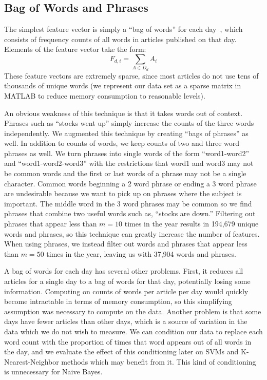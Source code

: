 \documentclass[10pt, twocolumn]{article}
\begin{document}
\subsection{Bag of Words and Phrases}
\label{sec:bagsofwords}

The simplest feature vector is simply a ``bag of words'' for each day~\cite{featurehash}, which consists of frequency counts of all words in articles published on that day. Elements of the feature vector take the form: $$\displaystyle F_{d,i} = \sum_{A \in D_d}{A_i}$$ These feature vectors are extremely sparse, since most articles do not use tens of thousands of unique words (we represent our data set as a sparse matrix
in MATLAB to reduce memory consumption to reasonable levels).

An obvious weakness of this technique is that it takes words out of context. Phrases such as ``stocks went up'' simply increase the counts of the three words independently. We augmented this technique by creating ``bags of phrases'' as well. In addition to counts of words, we keep counts of two and three word phrases
as well. We turn phrases into single words of the form ``word1-word2'' and ``word1-word2-word3'' with the restrictions that word1 and word3 may not be common words and the first or last words of a phrase may not be a single character. Common words beginning a 2 word phrase or ending a 3 word phrase are undesirable because we want to pick up on phrases where the subject is important. The middle word in the 3 word phrases may be common so we find phrases that combine two useful words such as, ``stocks are down.'' Filtering out phrases that appear less than $m = 10$ times in the year results in 194,679 unique words and phrases, so this technique can greatly increase the number of features. When using phrases, we instead filter out words and phrases that appear less than $m = 50$ times in the year, leaving us with 37,904 words and phrases. 

A bag of words for each day has several other problems. First, it reduces all articles for a single day to a bag of words for that day, potentially losing some information. Computing on counts of words per article per day would quickly become intractable in terms of memory consumption, so this simplifying assumption was necessary to compute on the data. Another problem is that some days have fewer articles than other days, which is a source of variation in the data which we do not wish to measure. We can condition our data to replace each word count with the proportion of times that word appears out of all words in the day, and we evaluate the effect of this conditioning later on SVMs and K-Nearest-Neighbor methods which may benefit from it. This kind of conditioning is unnecessary for Naive Bayes.
\end{document}
